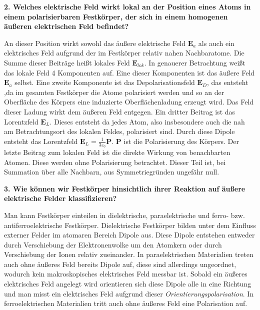 \noindent\textbf{2. Welches elektrische Feld wirkt lokal an der Position eines Atoms in einem polarisierbaren Festkörper, der sich in einem homogenen äußeren elektrischen Feld befindet?}\\
\begin{addmargin}[25pt]{0pt}
An dieser Position wirkt sowohl das äußere elektrische Feld $\mathbf{E}_a$ als auch ein elektrisches Feld aufgrund der im Festkörper relativ nahen Nachbaratome. Die Summe dieser Beiträge heißt lokales Feld $\mathbf{E}_{lok}$. In genauerer Betrachtung weißt das lokale Feld 4 Komponenten auf. Eine dieser Komponenten ist das äußere Feld $\mathbf{E}_a$ selbst. Eine zweite Komponente ist das Depolarisationsfeld $\mathbf{E}_D$, das entsteht ,da im gesamten Festkörper die Atome polarisiert werden und so an der Oberfläche des Körpers eine induzierte Oberflächenladung erzeugt wird. Das Feld dieser Ladung wirkt dem äußeren Feld entgegen. Ein dritter Beitrag ist das Lorentzfeld $\mathbf{E}_L$. Dieses entsteht da jedes Atom, also insbesondere auch die nah am Betrachtungsort des lokalen Feldes, polarisiert sind. Durch diese Dipole entsteht das Lorentzfeld $\mathbf{E}_L = \frac{1}{3\varepsilon_0}\mathbf{P}$. $\mathbf{P}$ ist die Polarisierung des Körpers. Der letzte Beitrag zum lokalen Feld ist die direkte Wirkung von benachbarten Atomen. Diese werden ohne Polarisierung betrachtet. Dieser Teil ist, bei Summation über alle Nachbarn, aus Symmetriegründen ungefähr null. \\
\end{addmargin}

\noindent\textbf{3. Wie können wir Festkörper hinsichtlich ihrer Reaktion auf äußere elektrische Felder klassifizieren?}\\
\begin{addmargin}[25pt]{0pt}
Man kann Festkörper einteilen in dielektrische, paraelektrische und ferro- bzw. antiferroelektrische Festkörper. Dielektrische Festkörper bilden unter dem Einfluss externer Felder im atomaren Bereich Dipole aus. Diese Dipole entstehen entweder durch Verschiebung der Elektronenwolke um den Atomkern oder durch Verschiebung der Ionen relativ zueinander. In paraelektrischen Materialien treten auch ohne äußeres Feld bereits Dipole auf, diese sind allerdings ungeordnet, wodurch kein makroskopisches elektrisches Feld messbar ist. Sobald ein äußeres elektrisches Feld angelegt wird orientieren sich diese Dipole alle in eine Richtung und man misst ein elektrisches Feld aufgrund dieser \textit{Orientierungspolarisation}. In ferroelektrischen Materialien tritt auch ohne äußeres Feld eine Polarisation auf. \\
\end{addmargin}

